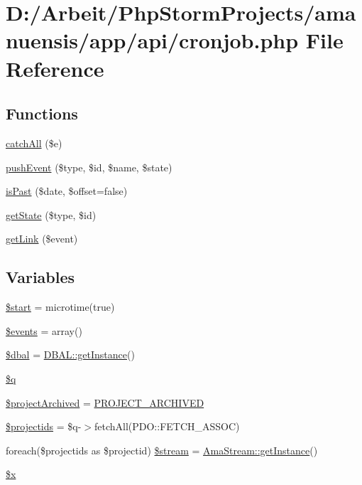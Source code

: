 \hypertarget{a00080}{}\section{D\+:/\+Arbeit/\+Php\+Storm\+Projects/amanuensis/app/api/cronjob.php File Reference}
\label{a00080}
\subsection*{Functions}
\begin{DoxyCompactItemize}
\item 
\hyperlink{a00080_a2a4d0fc0c8817862d5c0c4769c909fa3}{catch\+All} (\$e)
\item 
\hyperlink{a00080_a3d91ce7e1e6e49cd135de307a8d8cec6}{push\+Event} (\$type, \$id, \$name, \$state)
\item 
\hyperlink{a00080_ad700f42d51c056202611f48d3d36c425}{is\+Past} (\$date, \$offset=false)
\item 
\hyperlink{a00080_a2af807e3480f82307c7714ae16b72af3}{get\+State} (\$type, \$id)
\item 
\hyperlink{a00080_aaf4c137ed921caea237bd1be2b596629}{get\+Link} (\$event)
\end{DoxyCompactItemize}
\subsection*{Variables}
\begin{DoxyCompactItemize}
\item 
\hyperlink{a00080_a50a00e7de77365e00b117e73aa82fb9b}{\$start} = microtime(true)
\item 
\hyperlink{a00080_a1bcec9bbd34255927faaf155bf3a940a}{\$events} = array()
\item 
\hyperlink{a00080_a19a2d11c597ce9e2b727d9e1657b118c}{\$dbal} = \hyperlink{a00022_ac93fbec81f07e5d15f80db907e63dc10}{D\+B\+A\+L\+::get\+Instance}()
\item 
\hyperlink{a00080_abb0f8f809252372e25f48d52b63ef29d}{\$q}
\item 
\hyperlink{a00080_a1675978feddab0f9a720c372412eba80}{\$project\+Archived} = \hyperlink{a00090_af95db4629e61f0761ec2d794434d109d}{P\+R\+O\+J\+E\+C\+T\+\_\+\+A\+R\+C\+H\+I\+V\+E\+D}
\item 
\hyperlink{a00080_a060f31ca5c54d6a34d9f54d90f69b82e}{\$projectids} = \$q-\/$>$fetch\+All(P\+D\+O\+::\+F\+E\+T\+C\+H\+\_\+\+A\+S\+S\+O\+C)
\item 
foreach(\$projectids as \$projectid) \hyperlink{a00080_a45c2378f9f1837fc72aea6a2a65148f0}{\$stream} = \hyperlink{a00010_ac93fbec81f07e5d15f80db907e63dc10}{Ama\+Stream\+::get\+Instance}()
\item 
\hyperlink{a00080_af3a16c5f0dd7a74cf9acf6a49fff73a7}{\$x}
\end{DoxyCompactItemize}


